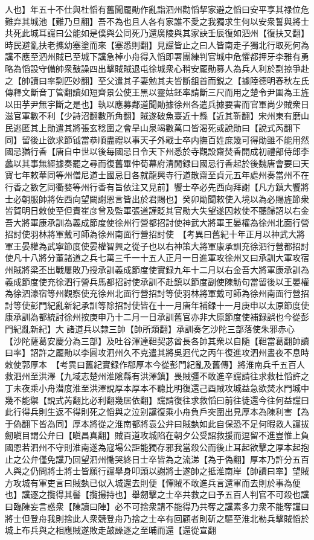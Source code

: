人也】年五十不仕與杜慆有舊聞龎勛作亂詣泗州勸慆挈家避之慆曰安平享其禄位危難弃其城池【難乃旦翻】吾不為也且人各有家誰不愛之我獨求生何以安衆誓與將士共死此城耳讜曰公能如是僕與公同死乃還廣陵與其家訣壬辰復如泗州【復扶又翻】時民避亂扶老攜幼塞塗而來【塞悉則翻】見讜皆止之曰人皆南走子獨北行取死何為讜不應至泗州賊已至城下讜急棹小舟得入慆即署團練判官城中危懼都押牙李雅有勇略為慆設守備帥衆皷譟四出擊賊賊退屯徐城衆心稍安龎勛募人為兵人利於剽掠爭赴之【帥讀曰率剽匹妙翻】至父遣其子妻勉其夫皆斷鉏首而鋭之【據陸德明春秋左氏傳釋文斷音丁管翻讀如短齊景公使王黑以靈姑鉟率請斷三尺而用之楚令尹圍為王旌以田芋尹無宇斷之是也】執以應募鄰道聞勛據徐州各遣兵據要害而官軍尚少賊衆日滋官軍數不利【少詩沼翻數所角翻】賊遂破魚臺近十縣【近其靳翻】宋州東有磨山民逃匿其上勛遣其將張玄稔圍之會旱山泉竭數萬口皆渴死或說勛曰【說式芮翻下同】留後止欲求節钺當恭順盡禮以事天子外戢士卒内撫百姓庶幾可得勛雖不能用然國忌猶行香【唐自中世以後每國忌日令天下州悉於寺觀設齋焚香開成初禮部侍郎李蠡以其事無經據奏罷之尋而復舊畢仲荀幕府清閒録曰國忌行香起於後魏唐會要曰天寶七年敕華同等州僧尼道士國忌日各就龍興寺行道散齋至貞元五年處州奏當州不在行香之數乞同衢婺等州行香有旨依注又見前】饗士卒必先西向拜謝【凡方鎮大饗將士必朝服帥將佐西向望闕謝恩言皆出於君賜也】癸卯勛聞敕使入境以為必賜旌節衆皆賀明日敕使至但責崔彦曾及監軍張道謹貶其官勛大失望遂囚敕使不聽歸詔以右金吾大將軍康承訓為義成節度使徐州行營都招討使神武大將軍王晏權為徐州北面行營招討使羽林將軍戴可師為徐州南面行營招討使　【考異曰舊紀十年正月以神武大將軍王晏權為武寧節度使晏權智興之從子也以右神策大將軍康承訓充徐泗行營都招討使凡十八將分董諸道之兵七萬三千一十五人正月一日進軍攻徐州又曰承訓大軍攻宿州賊將梁丕出戰屢敗乃授承訓義成節度使實録九年十二月以右金吾大將軍康承訓為義成節度使充徐泗行營兵馬都招討使承訓不赴鎮以節度副使陳魴句當留後以王晏權為徐泗濠宿等州觀察使充徐州北面行營招討等使羽林將軍戴可師為徐州南面行營招討等使彭門紀亂新紀承訓等除招討使皆在十一月唐年補録十一月庚申以太原節度使康承訓為都統討徐州按庚申乃十二月一日承訓舊官亦非大原節度使補録誤也今從彭門紀亂新紀】大諸道兵以隸三帥【帥所類翻】承訓奏乞沙陀三部落使朱邪赤心【沙陀薩葛安慶分為三部】及吐谷渾達靼契苾酋長各帥其衆以自隨【靼當葛翻帥讀曰率】詔許之龎勛以李圓攻泗州久不克遣其將吳迥代之丙午復進攻泗州晝夜不息時敕使郭厚本　【考異曰舊紀實録作郗厚本今從彭門紀亂及舊傳】將淮南兵千五百人救泗州至洪澤【九域志楚州淮隂縣有洪澤鎮】畏賊彊不敢進辛讜請往求救杜慆許之丁未夜乘小舟潜度淮至洪澤說厚本厚本不聽比明復還己酉賊攻城益急欲焚水門城中幾不能禦【說式芮翻比必利翻幾居依翻】讜請復往求救慆曰前往徒還今往何益讜曰此行得兵則生返不得則死之慆與之泣别讜復乘小舟負戶突圍出見厚本為陳利害【為于偽翻下皆為同】厚本將從之淮南都將袁公弁曰賊埶如此自保恐不足何暇救人讜拔劒瞋目謂公弁曰【瞋昌真翻】賊百道攻城陷在朝夕公受詔救援而逗留不進豈惟上負國恩若泗州不守則淮南遂為寇場公詎能獨存邪我當殺公而後止耳起欲擊之厚本起抱止之公弁僅免讜乃回望泗州慟哭終日士卒皆為之流涕【為于偽翻】厚本乃許分五百人與之仍問將士將士皆願行讜舉身叩頭以謝將士遂帥之抵淮南岸【帥讀曰率】望賊方攻城有軍吏言曰賊埶已似入城還去則便【憚賊不敢進兵言還軍而去則於事為便也】讜逐之攬得其髻【攬撮持也】舉劒擊之士卒共救之曰予五百人判官不可殺也讜曰臨陳妄言惑衆【陳讀曰陣】必不可捨衆請不能得乃共奪之讜素多力衆不能奪讜曰將士但登舟我則捨此人衆競登舟乃捨之士卒有回顧者則斫之驅至淮北勒兵擊賊慆於城上布兵與之相應賊遂敗走皷譟逐之至晡而還【還從宣翻